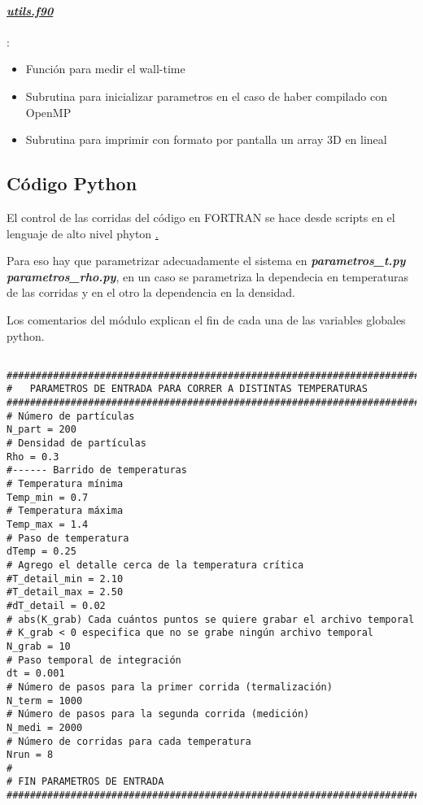 \paragraph{\underline{\textit{utils.f90}}}:

\begin{itemize}
   \item Función para medir el wall-time

 \item   Subrutina para inicializar parametros en el caso de haber compilado con OpenMP

 \item   Subrutina para imprimir con formato por pantalla un array 3D en lineal 

\end{itemize}



\subsection{Código Python}

El control de las corridas del código en FORTRAN se hace desde scripts en el lenguaje
de alto nivel phyton \href{http://www.python.org/}. 

Para eso hay que parametrizar adecuadamente el sistema en \textbf{\textit{parametros\_t.py}}
\textbf{\textit{parametros\_rho.py}}, en un caso se parametriza la dependecia en temperaturas
de las corridas y en el otro la dependencia en la densidad.
 
Los comentarios del módulo explican el fin de cada una de las variables globales python.

\begin{verbatim}

###############################################################################       
#   PARAMETROS DE ENTRADA PARA CORRER A DISTINTAS TEMPERATURAS
###############################################################################
# Número de partículas
N_part = 200
# Densidad de partículas
Rho = 0.3
#------ Barrido de temperaturas
# Temperatura mínima
Temp_min = 0.7
# Temperatura máxima
Temp_max = 1.4
# Paso de temperatura
dTemp = 0.25
# Agrego el detalle cerca de la temperatura crítica
#T_detail_min = 2.10
#T_detail_max = 2.50
#dT_detail = 0.02
# abs(K_grab) Cada cuántos puntos se quiere grabar el archivo temporal
# K_grab < 0 especifica que no se grabe ningún archivo temporal
N_grab = 10
# Paso temporal de integración
dt = 0.001
# Número de pasos para la primer corrida (termalización)
N_term = 1000
# Número de pasos para la segunda corrida (medición)
N_medi = 2000
# Número de corridas para cada temperatura
Nrun = 8
#
# FIN PARAMETROS DE ENTRADA
###############################################################################

\end{verbatim}


